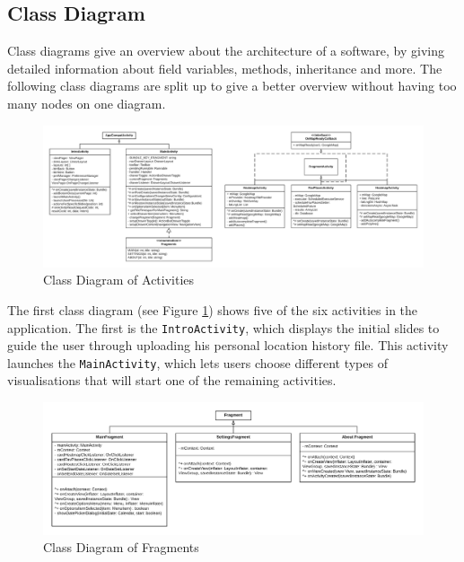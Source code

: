 \documentclass[12p]{article}
\begin{document}
    \newpage
    \subsection{Class Diagram}
    
    Class diagrams give an overview about the architecture of a software, by giving detailed information about field variables, methods, inheritance and more. The following class diagrams are split up to give a better overview without having too many nodes on one diagram.
    
    \begin{figure}[H]
        \center
        \includegraphics[width=1.0\textwidth]{class_diagram/class_diagram_1}
	    \caption{Class Diagram of Activities}
	    \label{fig:class_diagram_activities}
    \end{figure}
    
    The first class diagram (see Figure \ref{fig:class_diagram_activities}) shows five of the six activities in the application. The first is the \texttt{IntroActivity}, which displays the initial slides to guide the user through uploading his personal location history file. This activity launches the \texttt{MainActivity}, which lets users choose different types of visualisations that will start one of the remaining activities.
    
    \begin{figure}[H]
        \center
        \includegraphics[width=1.0\textwidth]{class_diagram/class_diagram_2}
	    \caption{Class Diagram of Fragments}
	    \label{fig:class_diagram_fragments}
    \end{figure}
    
\end{document}
